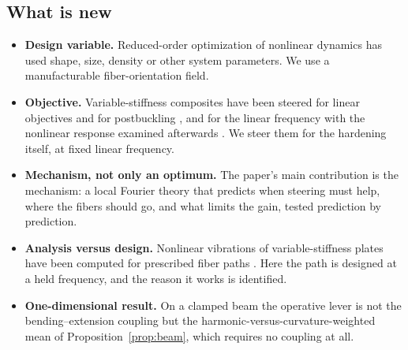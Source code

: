 \subsection{What is new}
\begin{itemize}[itemsep=1pt]
\item \textbf{Design variable.} Reduced-order optimization of nonlinear dynamics
  \cite{pozzi2024lsm,pozzi2025,pozzi2025smo,liang2025,xiao2026} has used shape, size, density or other system parameters. We use a
  manufacturable fiber-orientation field.
\item \textbf{Objective.} Variable-stiffness composites \cite{gurdal,ijsselmuiden} have been
  steered for linear objectives and for postbuckling \cite{wu2013,raju2018}, and for the
  linear frequency with the nonlinear response examined afterwards
  \cite{farsadi2021,farsadi2025}. We steer them for the hardening itself, at fixed linear
  frequency.
\item \textbf{Mechanism, not only an optimum.} The paper's main contribution is the
  mechanism: a local Fourier theory that predicts when steering must help, where the
  fibers should go, and what limits the gain, tested prediction by prediction.
\item \textbf{Analysis versus design.} Nonlinear vibrations of variable-stiffness plates
  have been computed for prescribed fiber paths
  \cite{ribeiro2012,ribeiroakhavan2012,akhavan2015,akhavan2017,houmat2013,yan2021}. Here
  the path is designed at a held frequency, and the reason it works is identified.
\item \textbf{One-dimensional result.} On a clamped beam the operative lever is not the
  bending--extension coupling but the harmonic-versus-curvature-weighted mean of
  Proposition~\ref{prop:beam}, which requires no coupling at all.
\end{itemize}

